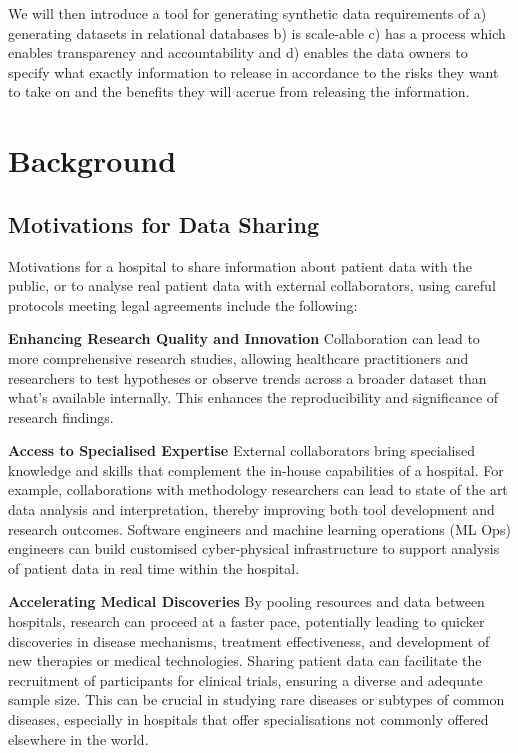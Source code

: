 \documentclass[11pt]{article}
\begin{document}
We will then introduce a tool for generating synthetic data requirements of a) generating datasets in relational databases b) is scale-able c) has a process which enables transparency and accountability and d) enables the data owners to specify what exactly information to release in accordance to the risks they want to take on and the benefits they will accrue from releasing the information.

\section{Background}

\subsection{Motivations for Data Sharing}

Motivations for a hospital to share information about patient data with the public, or to analyse real patient data with external collaborators, using careful protocols meeting legal agreements include the following:

\textbf{Enhancing Research Quality and Innovation} 
Collaboration can lead to more comprehensive research studies, allowing healthcare practitioners and researchers to test hypotheses or observe trends across a broader dataset than what's available internally. This enhances the reproducibility and significance of research findings.

\textbf{Access to Specialised Expertise} 
External collaborators bring specialised knowledge and skills that complement the in-house capabilities of a hospital. For example, collaborations with methodology researchers can lead to state of the art data analysis and interpretation, thereby improving both tool development and research outcomes. Software engineers and machine learning operations (ML Ops) engineers can build customised cyber-physical infrastructure to support analysis of patient data in real time within the hospital.

\textbf{Accelerating Medical Discoveries}
By pooling resources and data between hospitals, research can proceed at a faster pace, potentially leading to quicker discoveries in disease mechanisms, treatment effectiveness, and development of new therapies or medical technologies. Sharing patient data can facilitate the recruitment of participants for clinical trials, ensuring a diverse and adequate sample size. This can be crucial in studying rare diseases or subtypes of common diseases, especially in hospitals that offer specialisations not commonly offered elsewhere in the world. 
\end{document}
